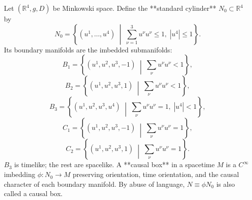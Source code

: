 Let $(\mathbb{R}^4, g, D)$ be Minkowski space. Define the **standard cylinder** $N_0 \subset \mathbb{R}^4$ by
$$N_0 = \left\{(u^1, \ldots, u^4) \;\middle|\; \sum_{\nu=1}^{3} u^\nu u^\nu \leq 1,\; |u^4| \leq 1\right\}.$$
Its boundary manifolds are the imbedded submanifolds:
$$B_1 = \left\{(u^1, u^2, u^3, -1) \;\middle|\; \sum_{\nu} u^\nu u^\nu < 1\right\},$$
$$B_2 = \left\{(u^1, u^2, u^3, 1) \;\middle|\; \sum_{\nu} u^\nu u^\nu < 1\right\},$$
$$B_3 = \left\{(u^1, u^2, u^3, u^4) \;\middle|\; \sum_{\nu} u^\nu u^\nu = 1,\; |u^4| < 1\right\},$$
$$C_1 = \left\{(u^1, u^2, u^3, -1) \;\middle|\; \sum_{\nu} u^\nu u^\nu = 1\right\},$$
$$C_2 = \left\{(u^1, u^2, u^3, 1) \;\middle|\; \sum_{\nu} u^\nu u^\nu = 1\right\}.$$
$B_3$ is timelike; the rest are spacelike. A **causal box** in a spacetime $M$ is a $C^\infty$ imbedding $\phi: N_0 \to M$ preserving orientation, time orientation, and the causal character of each boundary manifold. By abuse of language, $N \equiv \phi N_0$ is also called a causal box.
